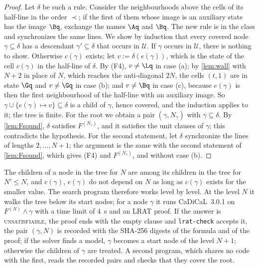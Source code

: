 \begin{proof}
Let $\delta$ be such a rule. Consider the neighbourhoods above the cells of
its half-line in the order $\prec$; if the first of them whose image is an
auxiliary state has the image $\Bq$, exchange the names $\Aq$ and $\Bq$. The new
rule is in the class and synchronizes the same lines. We show by induction that
every covered node $\gamma\subseteq\delta$ has a descendant
$\gamma'\subseteq\delta$ that occurs in $\mathcal U$. If $\gamma$ occurs in
$\mathcal U$, there is nothing to show. Otherwise $c(\gamma)$ exists; let
$v:=\delta(e(\gamma))$, which is the state of the cell $c(\gamma)$ in the
half-line of $\delta$. By (F4), $v\ne\Lq$ in case (a); by \cref{lem:wall} with
$N+2$ in place of $N$, which reaches the anti-diagonal $2N$, the cells $(t,1)$
are in state $\Gq$ and $v\ne\Gq$ in case (b); and $v\ne\Bq$ in case (c), because $e(\gamma)$ is then the
first neighbourhood of the half-line with an auxiliary image. So
$\gamma\cup\{e(\gamma)\mapsto v\}\subseteq\delta$ is a child of $\gamma$, hence
covered, and the induction applies to it; the tree is finite. For the root we
obtain a pair $(\gamma,N_\gamma)$ with $\gamma\subseteq\delta$. By
\cref{lem:Fsound}, $\delta$ satisfies $F^{(N_\gamma)}$, and it satisfies the
unit clauses of $\gamma$; this contradicts the hypothesis. For the second
statement, let $\delta$ synchronize the lines of lengths $2,\dots,N+1$; the
argument is the same with the second statement of \cref{lem:Fsound}, which
gives (F4) and $F^{(N_\gamma)}$, and without case (b).
\end{proof}

The children of a node in the tree for $N$ are among its children in the tree
for $N'\le N$, and $c(\gamma)$, $e(\gamma)$ do not depend on $N$ as long as
$c(\gamma)$ exists for the smaller value. The search program therefore works
level by level. At the level $N$ it walks the tree below its start nodes; for
a node $\gamma$ it runs CaDiCaL~3.0.1 on $F^{(N)}\wedge\gamma$ with a time limit
of $4$~s and an LRAT proof. If the answer is \textsc{unsatisfiable}, the proof
ends with the empty clause and \texttt{lrat-check} accepts it, the pair
$(\gamma,N)$ is recorded with the SHA-256 digests of the formula and of the
proof; if the solver finds a model, $\gamma$ becomes a start node of the level
$N+1$; otherwise the children of $\gamma$ are treated. A second program, which
shares no code with the first, reads the recorded pairs and checks that they
cover the root.


